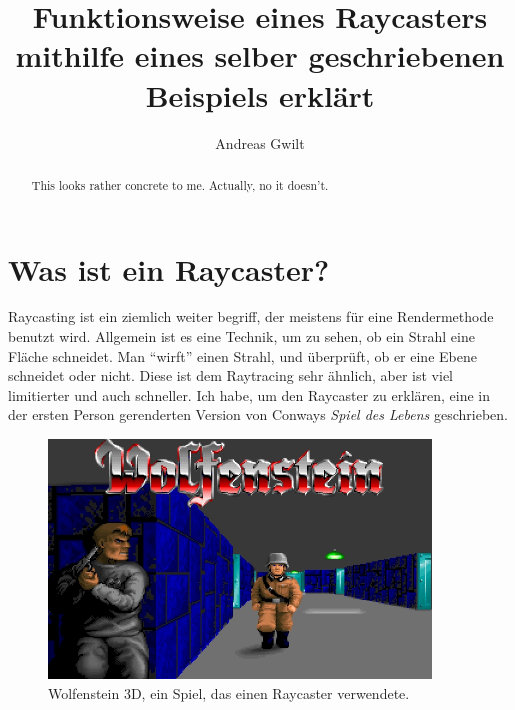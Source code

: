 \documentclass[a4paper,11pt]{report}
\title{Funktionsweise eines Raycasters mithilfe eines selber geschriebenen Beispiels erkl\"art}
\author{Andreas Gwilt}
\begin{document}
\maketitle
\tableofcontents

\begin{abstract}
This looks rather concrete to me. Actually, no it doesn't.
\end{abstract}

\section{Was ist ein Raycaster?}
Raycasting ist ein ziemlich weiter begriff, der meistens für eine Rendermethode benutzt wird. Allgemein ist es eine Technik, um zu sehen, ob ein Strahl eine Fläche schneidet. Man ``wirft'' einen Strahl, und überprüft, ob er eine Ebene schneidet oder nicht. Diese ist dem Raytracing sehr ähnlich, aber ist viel limitierter und auch schneller.
Ich habe, um den Raycaster zu erklären, eine in der ersten Person gerenderten Version von Conways \textit{Spiel des Lebens} geschrieben. 

\begin{figure}[htbp] 
        \centering
        \includegraphics[width=4in]{wolfenstein-cover.jpg} 
        \caption{Wolfenstein 3D, ein Spiel, das einen Raycaster verwendete.}
\end{figure}
\end{document}
